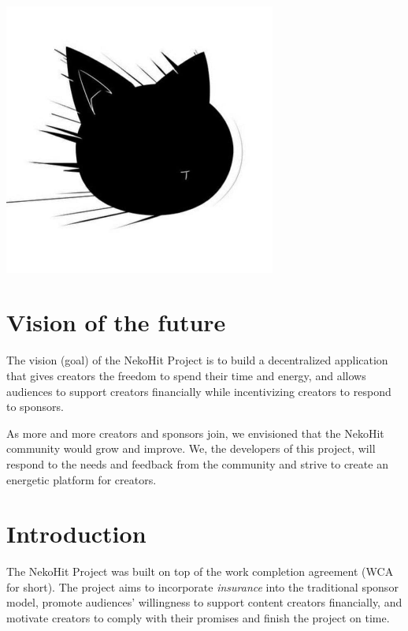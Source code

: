 \documentclass[12pt,a4paper]{article}
\begin{document}
    \tableofcontents
    \vspace*{\fill}
    \begin{center}
        \includegraphics[width=0.67\textwidth]{assets/img197}
    \end{center}
    \clearpage



    \section{Vision of the future}\label{sec:goal}

    The vision (goal) of the NekoHit Project is to build a decentralized
    application that gives creators the freedom to spend their time and energy,
    and allows audiences to support creators financially while incentivizing
    creators to respond to sponsors.

    As more and more creators and sponsors join, we envisioned that the NekoHit
    community would grow and improve.
    We, the developers of this project, will respond to the needs and feedback
    from the community and strive to create an energetic platform for creators.


    \section{Introduction}\label{sec:intro}

    The NekoHit Project was built on top of the work completion agreement (WCA
    for short).
    The project aims to incorporate \textit{insurance} into the traditional sponsor
    model, promote audiences' willingness to support content creators financially,
    and motivate creators to comply with their promises and finish the project
    on time.
\end{document}
